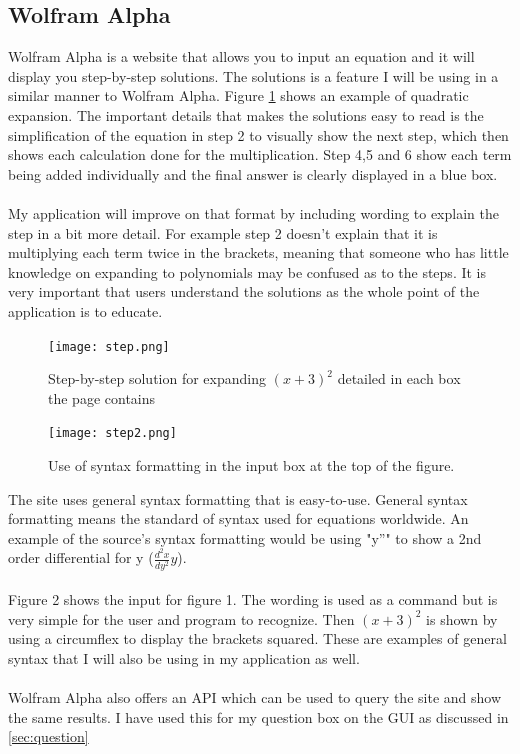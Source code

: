 \documentclass[final]{cmpreport}
\begin{document}
	\subsection{Wolfram Alpha} \label{sec:wolf}
	Wolfram Alpha \cite{Wolfram-Alpha} is a website that allows you to input an equation and it will display you step-by-step solutions. The solutions is a feature I will be using in a similar manner to Wolfram Alpha. Figure \ref{fig:step} shows an example of quadratic expansion. The important details that makes the solutions easy to read is the simplification of the equation in step 2 to visually show the next step, which then shows each calculation done for the multiplication. Step 4,5 and 6 show each term being added individually and the final answer is clearly displayed in a blue box. \\
	\\My application will improve on that format by including wording to explain the step in a bit more detail. For example step 2 doesn't explain that it is multiplying each term twice in the brackets, meaning that someone who has little knowledge on expanding to polynomials may be confused as to the steps. It is very important that users understand the solutions as the whole point of the application is to educate.\\
	\begin{figure}[H]
		\caption{Step-by-step solution for expanding $(x+3)^2$ detailed in each box the page contains}
		\centering
		\texttt{[image: step.png]}
		\label{fig:step}
	\end{figure}
	\begin{figure}[H]
		\caption{Use of syntax formatting in the input box at the top of the figure.}
		\centering
		\texttt{[image: step2.png]}
	\end{figure}
	The site uses general syntax formatting that is easy-to-use. General syntax formatting means the standard of syntax used for equations worldwide. An example of the source's syntax formatting would be using "y''" to show a 2nd order differential for y ($\frac{d^2x}{dy^2} y$). \\
	\\Figure 2 shows the input for figure 1. The wording is used as a command but is very simple for the user and program to recognize. Then $(x+3)^2$ is shown by using a circumflex to display the brackets squared. These are examples of general syntax that I will also be using in my application as well.\\
	\\Wolfram Alpha also offers an API which can be used to query the site and show the same results. I have used this for my question box on the GUI as discussed in \ref{sec:question}\\
\end{document}
